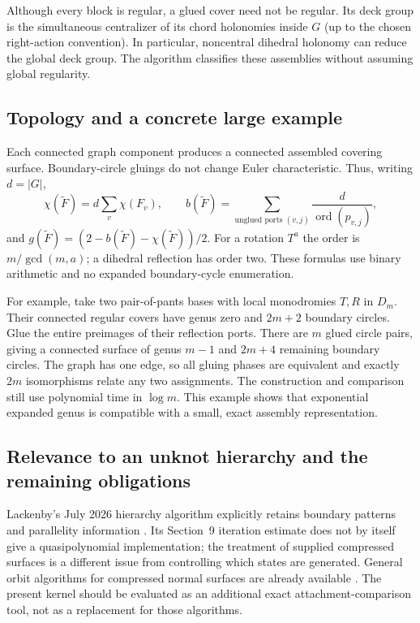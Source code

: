 Although every block is regular, a glued cover need not be regular.
Its deck group is the simultaneous centralizer of its chord holonomies
inside $G$ (up to the chosen right-action convention).  In particular,
noncentral dihedral holonomy can reduce the global deck group.  The
algorithm classifies these assemblies without assuming global regularity.

\subsection{Topology and a concrete large example}

Each connected graph component produces a connected assembled covering
surface.  Boundary-circle gluings do not change Euler characteristic.
Thus, writing $d=|G|$,
\[
 \chi(\widetilde F)=d\sum_{v}\chi(F_v),\qquad
 b(\widetilde F)
 =\sum_{\text{unglued ports }(v,j)}
        \frac{d}{\operatorname{ord}(p_{v,j})},
\]
and $g(\widetilde F)=(2-b(\widetilde F)-\chi(\widetilde F))/2$.
For a rotation $T^a$ the order is $m/\gcd(m,a)$; a dihedral reflection
has order two.  These formulas use binary arithmetic and no expanded
boundary-cycle enumeration.

For example, take two pair-of-pants bases with local monodromies $T,R$
in $D_m$.  Their connected regular covers have genus zero and $2m+2$
boundary circles.  Glue the entire preimages of their reflection ports.
There are $m$ glued circle pairs, giving a connected surface of genus
$m-1$ and $2m+4$ remaining boundary circles.  The graph has one edge, so
all gluing phases are equivalent and exactly $2m$ isomorphisms relate
any two assignments.  The construction and comparison still use
polynomial time in $\log m$.  This example shows that exponential
expanded genus is compatible with a small, exact assembly representation.

\subsection{Relevance to an unknot hierarchy and the remaining obligations}

Lackenby's July 2026 hierarchy algorithm explicitly retains boundary
patterns and parallelity information \cite{lackenby2026}.  Its
Section~9 iteration estimate does not by itself give a quasipolynomial
implementation; the treatment of supplied compressed surfaces is a
different issue from controlling which states are generated.
General orbit algorithms for compressed normal surfaces are already
available \cite{aht-orbits}.  The present kernel should be evaluated as
an additional exact attachment-comparison tool, not as a replacement
for those algorithms.

